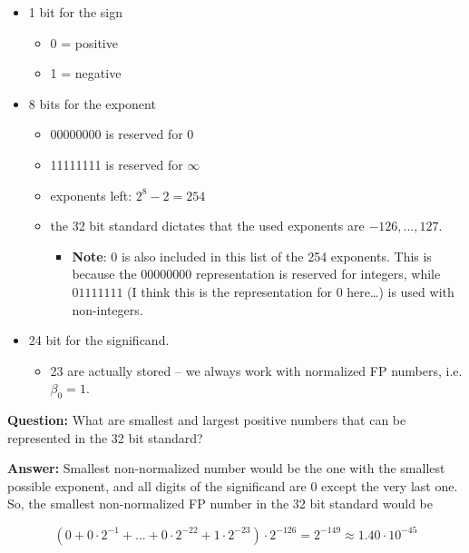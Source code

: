 \documentclass[]{book}
\providecommand{\tightlist}{%
  \setlength{\itemsep}{0pt}\setlength{\parskip}{0pt}}
\theoremstyle{definition}
\theoremstyle{definition}
\theoremstyle{definition}
\theoremstyle{remark}
\begin{document}
\begin{itemize}
\tightlist
\item
  1 bit for the sign

  \begin{itemize}
  \tightlist
  \item
    0 = positive
  \item
    1 = negative
  \end{itemize}
\item
  8 bits for the exponent

  \begin{itemize}
  \tightlist
  \item
    00000000 is reserved for 0
  \item
    11111111 is reserved for \(\infty\)
  \item
    exponents left: \(2^8 - 2 = 254\)
  \item
    the 32 bit standard dictates that the used exponents are
    \(-126,...,127\).

    \begin{itemize}
    \tightlist
    \item
      \textbf{Note}: \(0\) is also included in this list of the 254
      exponents. This is because the \(00000000\) representation is
      reserved for integers, while \(01111111\) (I think this is the
      representation for \(0\) here\ldots{}) is used with non-integers.
    \end{itemize}
  \end{itemize}
\item
  24 bit for the significand.

  \begin{itemize}
  \tightlist
  \item
    23 are actually stored -- we always work with normalized FP numbers,
    i.e. \(\beta_0 = 1\).
  \end{itemize}
\end{itemize}

\textbf{Question:} What are smallest and largest positive numbers that
can be represented in the 32 bit standard?

\textbf{Answer:} Smallest non-normalized number would be the one with
the smallest possible exponent, and all digits of the significand are 0
except the very last one. So, the smallest non-normalized FP number in
the 32 bit standard would be

\[
\left(0 + 0\cdot 2^{-1} + ... + 0\cdot 2^{-22} + 1\cdot 2^{-23}\right)\cdot 2^{-126} = 2^{-149} \approx 1.40\cdot 10^{-45}
\]
\end{document}
